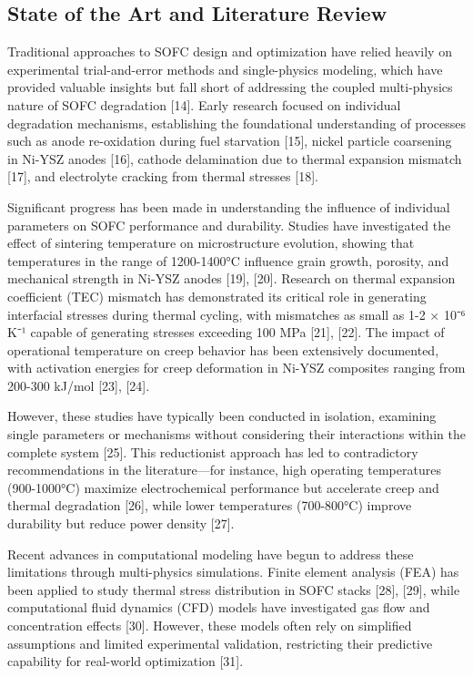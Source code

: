 \documentclass[10pt,conference]{IEEEtran}
\begin{document}
\subsection{State of the Art and Literature Review}

Traditional approaches to SOFC design and optimization have relied heavily on experimental trial-and-error methods and single-physics modeling, which have provided valuable insights but fall short of addressing the coupled multi-physics nature of SOFC degradation [14]. Early research focused on individual degradation mechanisms, establishing the foundational understanding of processes such as anode re-oxidation during fuel starvation [15], nickel particle coarsening in Ni-YSZ anodes [16], cathode delamination due to thermal expansion mismatch [17], and electrolyte cracking from thermal stresses [18].

Significant progress has been made in understanding the influence of individual parameters on SOFC performance and durability. Studies have investigated the effect of sintering temperature on microstructure evolution, showing that temperatures in the range of 1200-1400°C influence grain growth, porosity, and mechanical strength in Ni-YSZ anodes [19], [20]. Research on thermal expansion coefficient (TEC) mismatch has demonstrated its critical role in generating interfacial stresses during thermal cycling, with mismatches as small as 1-2 × 10⁻⁶ K⁻¹ capable of generating stresses exceeding 100 MPa [21], [22]. The impact of operational temperature on creep behavior has been extensively documented, with activation energies for creep deformation in Ni-YSZ composites ranging from 200-300 kJ/mol [23], [24].

However, these studies have typically been conducted in isolation, examining single parameters or mechanisms without considering their interactions within the complete system [25]. This reductionist approach has led to contradictory recommendations in the literature—for instance, high operating temperatures (900-1000°C) maximize electrochemical performance but accelerate creep and thermal degradation [26], while lower temperatures (700-800°C) improve durability but reduce power density [27].

Recent advances in computational modeling have begun to address these limitations through multi-physics simulations. Finite element analysis (FEA) has been applied to study thermal stress distribution in SOFC stacks [28], [29], while computational fluid dynamics (CFD) models have investigated gas flow and concentration effects [30]. However, these models often rely on simplified assumptions and limited experimental validation, restricting their predictive capability for real-world optimization [31].
\end{document}
